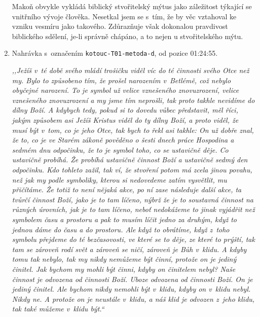 \begin{enumerate}
{Makoň obvykle vykládá biblický stvořitelský mýtus jako záležitost týkající se
        vnitřního vývoje člověka. Nesetkal jsem se s~tím, že by věc vztahoval ke
        vzniku vesmíru jako takového. Zdůrazňuje však dokonalou pravdivost
        biblického sdělení, je-li správně chápáno, a to nejen u stvořitelského
        mýtu.

}


\item{
Nahrávka s~označením \texttt{kotouc-T01-metoda-d}, od pozice 01:24:55.

\textit{%
,,Ježíš v~té době svého mládí trošičku viděl víc do té činnosti svého Otce než
my. Bylo to způsobeno tím, že prošel narozením v~Betlémě, což nebylo obyčejné
narození. To je symbol už velice vznešeného znovuzrození, velice vznešeného
znovuzrození a my jsme tím neprošli, tak proto takhle nevidíme do dílny Boží. A
kdybych tedy, pokud si to dovedu vůbec představit, měl říci, jakým způsobem asi
Ježíš Kristus viděl do ty dílny Boží, a proto viděl, že musí být v~tom, co je jeho
Otce, tak bych to řekl asi takhle: On už dobře znal, že to, co je ve Starém zákoně
pověděno o šesti dnech práce Hospodina a sedmém dnu odpočinku, že to je symbol
toho, co se ustavičně děje. Co ustavičně probíhá. Že probíhá ustavičně činnost Boží
a ustavičně sedmý den odpočinku. Kdo tohleto zažil, tak ví, že stvoření potom má
zcela jinou povahu, než jak my podle symboliky, kterou si nedovedeme zatím
vysvětlit, mu
přičítáme. Že totiž to není nějaká akce, po ní zase následuje další akce, ta tvůrčí
činnost Boží, jako je to tam líčeno, nýbrž že je to soustavná činnost na různých
úrovních, jak je to tam líčeno, neboť nedokážeme to jinak vyjádřit než symbolem
času a prostoru a pak to musím líčit jedno za druhým, když to jednou dáme do času
a do prostoru. Ale když to obrátíme, když z~toho symbolu přejdeme do té
bezčasovosti,
ve které se to děje, ze které to prýští, tak tam se zároveň rodí svět a zároveň se
ničí, zároveň je Bůh v~klidu. A kdyby tomu tak nebylo, tak my nikdy nemůžeme být
činní, protože on je jediný činitel. Jak bychom my mohli být činni, kdyby on
činitelem nebyl? Naše činnost je odvozena od činnosti Boží. Uboze odvozena od
činnosti Boží.
On je jediný činitel. Ale bychom nikdy nemohli být v~klidu, kdyby on v~klidu
nebyl.
Nikdy ne. A protože on je neustále v~klidu, a náš klid je odvozen z~jeho klidu,
tak také můžeme v~klidu být.``
}

}
\end{enumerate}
